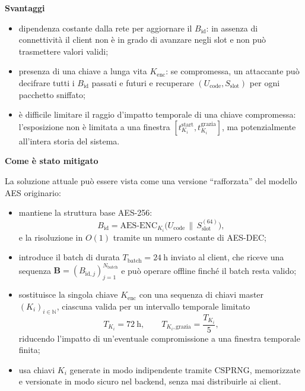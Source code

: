\documentclass[a4paper,11pt]{article}
\begin{document}
\textbf{Svantaggi}

\begin{itemize}[nosep]
  \item dipendenza costante dalla rete per aggiornare il \(B_{\text{id}}\): in assenza di
        connettività il client non è in grado di avanzare negli slot e non può trasmettere valori
        validi;
  \item presenza di una chiave a lunga vita \(K_{\text{enc}}\): se compromessa, un attaccante può
        decifrare tutti i \(B_{\text{id}}\) passati e futuri e recuperare
        \((U_{\text{code}}, S_{\text{slot}})\) per ogni pacchetto sniffato;
  \item è difficile limitare il raggio d'impatto temporale di una chiave compromessa: l’esposizione
        non è limitata a una finestra \([t_{K_i}^{\text{start}}, t_{K_i}^{\text{grazia}}]\), ma
        potenzialmente all’intera storia del sistema.
\end{itemize}

\textbf{Come è stato mitigato}

La soluzione attuale può essere vista come una versione ``rafforzata'' del modello AES originario:

\begin{itemize}[nosep]
  \item mantiene la struttura base AES-256:
        \[
          B_{\text{id}} = \mathrm{AES\text{-}ENC}_{K_i}
          \bigl(U_{\text{code}} \,\|\, S_{\text{slot}}^{(64)}\bigr),
        \]
        e la risoluzione in \(O(1)\) tramite un numero costante di AES-DEC;
  \item introduce il batch di durata \(T_{\text{batch}} = \SI{24}{\hour}\) inviato al client, che riceve
        una sequenza
        \(\mathbf{B} = (B_{\text{id},j})_{j=1}^{N_{\text{batch}}}\) e può operare offline finché il batch
        resta valido;
  \item sostituisce la singola chiave \(K_{\text{enc}}\) con una sequenza di chiavi master
        \((K_i)_{i \in \mathbb{N}}\), ciascuna valida per un intervallo temporale limitato
        \[
          T_{K_i} = \SI{72}{\hour},
          \qquad
          T_{K_i,\mathrm{grazia}} = \frac{T_{K_i}}{5},
        \]
        riducendo l’impatto di un’eventuale compromissione a una finestra temporale finita;
  \item usa chiavi \(K_i\) generate in modo indipendente tramite CSPRNG, memorizzate e versionate
        in modo sicuro nel backend, senza mai distribuirle ai client.
\end{itemize}
\end{document}
